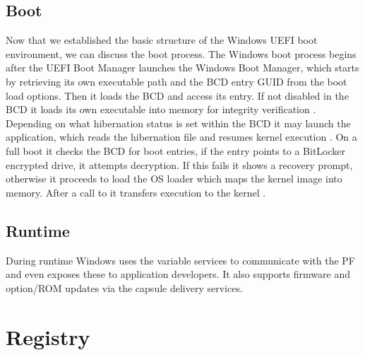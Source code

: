 \subsection{Boot}

Now that we established the basic structure of the Windows UEFI boot environment, we can discuss the boot process.
The Windows boot process begins after the UEFI Boot Manager launches the Windows Boot Manager, which starts by retrieving its own executable path and the \ac{BCD} entry GUID from the boot load options.
Then it loads the \ac{BCD} and access its entry.
If not disabled in the \ac{BCD} it loads its own executable into memory for integrity verification \cite[Section 12]{windows-internals-7-part2}.
Depending on what hibernation status is set within the \ac{BCD} it may launch the  application, which reads the hibernation file and resumes kernel execution \cite[Section 12]{windows-internals-7-part2}.
On a full boot it checks the \ac{BCD} for boot entries, if the entry points to a BitLocker encrypted drive, it attempts decryption.
If this fails it shows a recovery prompt, otherwise it proceeds to load the \ac{OS} loader  which maps the kernel image  into memory. After a call to  it transfers execution to the kernel \cite[Section 12]{windows-internals-7-part2}.

\subsection{Runtime}

During runtime Windows uses the variable services to communicate with the \ac{PF} and even exposes these to application developers.
It also supports firmware and option\-/\ac{ROM} updates via the capsule delivery services.

\section{Registry}

